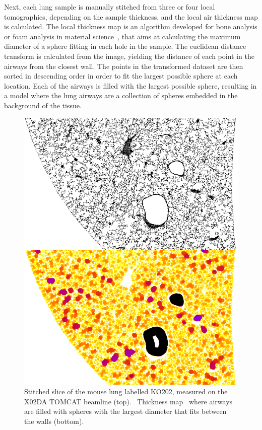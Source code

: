 \documentclass[preprint,12pt]{elsarticle}
\begin{document}
Next, each lung sample is manually stitched from three or four local
tomographies, depending on the sample thickness, and the local air thickness
map is calculated. The local thickness map is an algorithm developed for
bone analysis or foam analysis in material science~\cite{Hildebrand_2003}, that aims
at calculating the maximum diameter of a sphere fitting in each hole in the
sample.
The euclidean distance transform is calculated from the image, yielding the
distance of each point in the airways from the closest
wall.
The points in the transformed dataset are then sorted in descending order in
order to fit the largest possible sphere at each location.
Each of the airways is filled with the largest possible
sphere, resulting in a model where the lung airways are a collection of
spheres embedded in the background of the tissue.
\begin{figure}[h!]
\begin{center}
\includegraphics[width=0.70\columnwidth]{figures/thickmap/thickmap}
\caption{{Stitched slice of the mouse lung labelled KO202, measured on the X02DA
TOMCAT beamline (top).~ Thickness map~ where airways are filled with
spheres with the largest diameter that fits between the walls (bottom).
{\label{939269}}%
}}
\end{center}
\end{figure}
\end{document}
